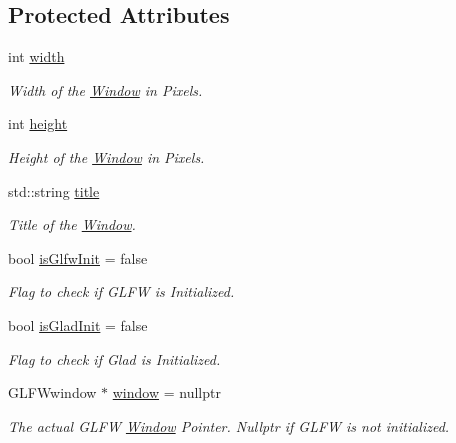 \subsection*{Protected Attributes}
\begin{DoxyCompactItemize}
\item 
int \mbox{\hyperlink{class_window_af5b1c436782cc9752d386493fbc5dc8c}{width}}
\begin{DoxyCompactList}\small\item\em Width of the \mbox{\hyperlink{class_window}{Window}} in Pixels. \end{DoxyCompactList}\item 
int \mbox{\hyperlink{class_window_af0ac1732ca6b79a6f6b78aa344140514}{height}}
\begin{DoxyCompactList}\small\item\em Height of the \mbox{\hyperlink{class_window}{Window}} in Pixels. \end{DoxyCompactList}\item 
std\+::string \mbox{\hyperlink{class_window_accc3e5364fced57c273820aa51410e12}{title}}
\begin{DoxyCompactList}\small\item\em Title of the \mbox{\hyperlink{class_window}{Window}}. \end{DoxyCompactList}\item 
bool \mbox{\hyperlink{class_window_aaeb459aaf4e4f822bb7411d557312328}{is\+Glfw\+Init}} = false
\begin{DoxyCompactList}\small\item\em Flag to check if G\+L\+FW is Initialized. \end{DoxyCompactList}\item 
bool \mbox{\hyperlink{class_window_a7a64d5cb08cc14d5d87cb4efa03fcb92}{is\+Glad\+Init}} = false
\begin{DoxyCompactList}\small\item\em Flag to check if Glad is Initialized. \end{DoxyCompactList}\item 
G\+L\+F\+Wwindow $\ast$ \mbox{\hyperlink{class_window_a9957db4afdad3d57e5c5b6626b44b6d0}{window}} = nullptr
\begin{DoxyCompactList}\small\item\em The actual G\+L\+FW \mbox{\hyperlink{class_window}{Window}} Pointer. Nullptr if G\+L\+FW is not initialized. \end{DoxyCompactList}\end{DoxyCompactItemize}
